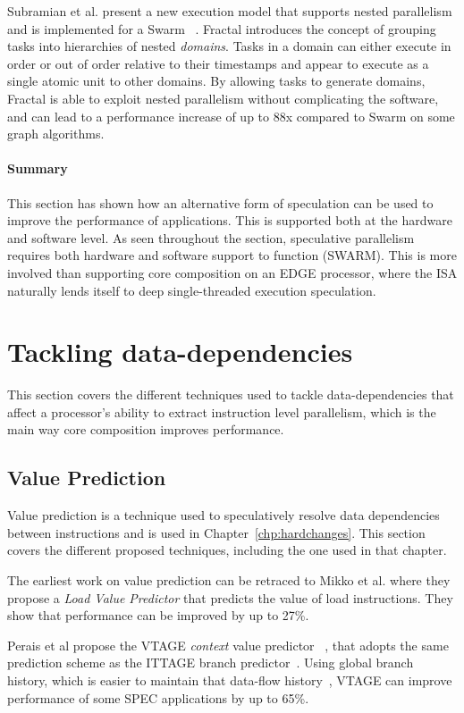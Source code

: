 Subramian et al. present a new execution model that supports nested parallelism and is implemented for a Swarm~\cite{fractal2017} .
Fractal introduces the concept of grouping tasks into hierarchies of nested \textit{domains}.
Tasks in a domain can either execute in order or out of order relative to their timestamps and appear to execute as a single atomic unit to other domains.
By allowing tasks to generate domains, Fractal is able to exploit nested parallelism without complicating the software, and can lead to a performance increase of up to 88x compared to Swarm on some graph algorithms.
\vspace{-1em}
\paragraph*{Summary}
This section has shown how an alternative form of speculation can be used to improve the performance of applications.
This is supported both at the hardware and software level.
As seen throughout the section, speculative parallelism requires both hardware and software support to function (SWARM).
This is more involved than supporting core composition on an EDGE processor, where the ISA naturally lends itself to deep single-threaded execution speculation.
\vspace{-1em}
\section{Tackling data-dependencies}
This section covers the different techniques used to tackle data-dependencies that affect a processor's ability to extract instruction level parallelism, which is the main way core composition improves performance.
\subsection{Value Prediction}
Value prediction is a technique used to speculatively resolve data dependencies between instructions and is used in Chapter~\ref{chp:hardchanges}.
This section covers the different proposed techniques, including the one used in that chapter. 

The earliest work on value prediction can be retraced to Mikko et al. where they propose a \textit{Load Value Predictor} \cite{lipasti96valpred} that predicts the value of load instructions.
They show that performance can be improved by up to 27\%.

Perais et al propose the VTAGE \textit{context} value predictor ~\cite{peraisVTAGE2014}, that adopts the same prediction scheme as the ITTAGE branch predictor~\cite{SeznecITTAGE}.
Using global branch history, which is easier to maintain that data-flow history~\cite{peraisVTAGE2014}, VTAGE can improve performance of some SPEC applications by up to 65\%.

